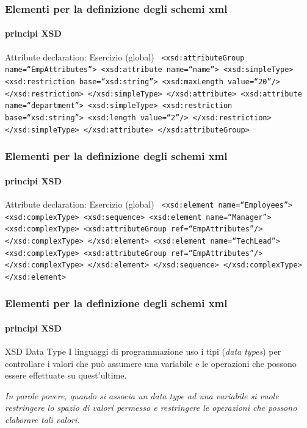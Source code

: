 \begin{frame}
	\frametitle{Elementi per la definizione degli schemi xml}
	\framesubtitle{principi XSD}
	\addtocounter{nframe}{1}

	\begin{block}{Attribute declaration: Esercizio (global)}
		\texttt{
			<xsd:attributeGroup name=``EmpAttributes''>
			<xsd:attribute name=``name''>
			<xsd:simpleType>
			<xsd:restriction base=``xsd:string''>
			<xsd:maxLength value=``20''/>
			</xsd:restriction>
			</xsd:simpleType>
			</xsd:attribute>
			<xsd:attribute name=``department''>
			<xsd:simpleType>
			<xsd:restriction base=``xsd:string''>
			<xsd:length value=``2''/>
			</xsd:restriction>
			</xsd:simpleType>
			</xsd:attribute>
			</xsd:attributeGroup>
		}
	\end{block}

\end{frame}


\begin{frame}
	\frametitle{Elementi per la definizione degli schemi xml}
	\framesubtitle{principi XSD}
	\addtocounter{nframe}{1}

	\begin{block}{Attribute declaration: Esercizio (global)}
		\texttt{
			<xsd:element name=``Employees''>
			<xsd:complexType>
			<xsd:sequence>
			<xsd:element name=``Manager''>
			<xsd:complexType>
			<xsd:attributeGroup ref=``EmpAttributes''/>
			</xsd:complexType>
			</xsd:element>
			<xsd:element name=``TechLead''>
			<xsd:complexType>
			<xsd:attributeGroup ref=``EmpAttributes''/>
			</xsd:complexType>
			</xsd:element>
			</xsd:sequence>
			</xsd:complexType>
			</xsd:element>
		}
	\end{block}

\end{frame}


\begin{frame}
	\frametitle{Elementi per la definizione degli schemi xml}
	\framesubtitle{principi XSD}
	\addtocounter{nframe}{1}

	\begin{block}{XSD Data Type}
		I linguaggi di programmazione uso i tipi (\textit{data types}) per controllare i valori che può assumere una variabile e le operazioni che possono essere effettuate su quest'ultime.
	\end{block}

		\textit{In parole povere, quando si associa un data type ad una variabile si vuole restringere lo spazio di valori permesso e restringere le operazioni che possono elaborare tali valori.}
	

\end{frame}

